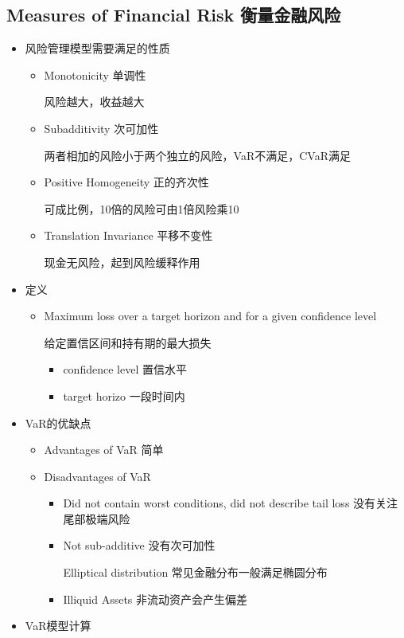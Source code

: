 \documentclass[a4paper,6pt,twoside,openany]{article}
\begin{document}
\subsection{Measures of Financial Risk 衡量金融风险}
\begin{itemize}
\item 风险管理模型需要满足的性质
  \begin{itemize}
  \item Monotonicity 单调性
    \par 风险越大，收益越大
  \item Subadditivity 次可加性
    \par 两者相加的风险小于两个独立的风险，VaR不满足，CVaR满足
  \item Positive Homogeneity 正的齐次性
    \par 可成比例，10倍的风险可由1倍风险乘10
  \item Translation Invariance 平移不变性
    \par 现金无风险，起到风险缓释作用
  \end{itemize}
\item 定义
  \begin{itemize}
  \item Maximum loss over a target horizon and for a given confidence level
    \par 给定置信区间和持有期的最大损失
    \begin{itemize}
    \item confidence level 置信水平
    \item target horizo 一段时间内
    \end{itemize}
  \end{itemize}
\item VaR的优缺点
  \begin{itemize}
  \item Advantages of VaR 简单
  \item Disadvantages of VaR
    \begin{itemize}
    \item Did not contain worst conditions, did not describe tail loss 没有关注尾部极端风险
    \item Not sub-additive 没有次可加性
      \par Elliptical distribution 常见金融分布一般满足椭圆分布
    \item Illiquid Assets 非流动资产会产生偏差
    \end{itemize}
  \end{itemize}
\item VaR模型计算

\end{itemize}
\end{document}
